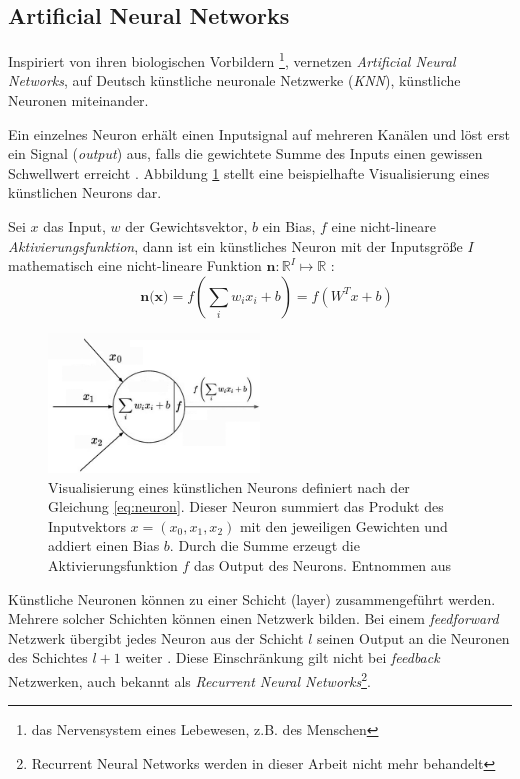 \subsection{Artificial Neural Networks}
Inspiriert von ihren biologischen Vorbildern \footnote{das Nervensystem eines Lebewesen, z.B. des Menschen}, vernetzen \textit{Artificial Neural Networks}, auf Deutsch künstliche neuronale Netzwerke (\textit{KNN}), künstliche Neuronen miteinander.

Ein einzelnes Neuron erhält einen Inputsignal auf mehreren Kanälen und löst erst ein Signal (\textit{output}) aus, falls die gewichtete Summe des Inputs einen gewissen Schwellwert erreicht \cite{CS231nConvolutionalNeural}. Abbildung \ref{fig:neuron} stellt eine beispielhafte Visualisierung eines künstlichen Neurons dar.

Sei $x$ das Input, $w$ der Gewichtsvektor, $b$ ein Bias, $f$ eine nicht-lineare \textit{Aktivierungsfunktion}, dann ist ein künstliches Neuron mit der Inputsgröße $I$ mathematisch eine nicht-lineare Funktion $\textbf{n} : \mathbb{R}^I \mapsto \mathbb{R}$ \cite{CS231nConvolutionalNeural}:
\begin{equation}
	\label{eq:neuron}
	\quad	\textbf{n(x)}=f\left(\sum_i w_{i} x_{i} + b\right) = f(W^Tx+b)
\end{equation}


\begin{figure}
	\centering
	\includegraphics[width=0.5\textwidth]{images/neuron_model.png}
	\caption{Visualisierung eines künstlichen Neurons definiert nach der Gleichung \ref{eq:neuron}. Dieser Neuron summiert das Produkt des Inputvektors $x = (x_0, x_1, x_2)$  mit den jeweiligen Gewichten und addiert einen Bias $b$. Durch die Summe erzeugt die Aktivierungsfunktion $f$ das Output des Neurons. Entnommen aus \cite{CS231nConvolutionalNeural}}
	\label{fig:neuron}
\end{figure}

Künstliche Neuronen können zu einer Schicht (layer) zusammengeführt werden. Mehrere solcher Schichten können einen Netzwerk bilden. Bei einem \textit{feedforward} Netzwerk übergibt jedes Neuron aus der Schicht $l$ seinen Output an die Neuronen des Schichtes $l+1$ weiter \cite{Goodfellow-et-al-2016}. Diese Einschränkung gilt nicht bei \textit{feedback} Netzwerken, auch bekannt als \textit{Recurrent Neural Networks}\footnote{Recurrent Neural Networks werden in dieser Arbeit nicht mehr behandelt}.

